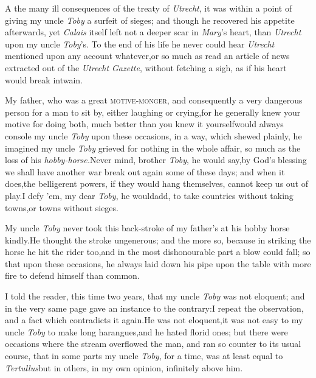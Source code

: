 \documentclass{article}
\begin{document}
\lettrine{A}{\!} the many ill consequences of
the treaty of \textit{Utrecht}, it was within a point of giving my
uncle \textit{Toby} a surfeit of sieges; and though he recovered his
appetite afterwards, yet \textit{Calais} itself left not a deeper
scar in \textit{Mary}’s heart, than \textit{Utrecht} upon my
uncle \textit{Toby}’s. To the end of his life he never could hear \textit{Utrecht} mentioned upon any
account whatever,\tsk or so much as read an article of news
extracted out of the \textit{Utrecht Gazette}, without fetching a
sigh, as if his heart would break in\break twain.

My father, who was a great \textsc{motive-monger}, and
consequently a very dangerous person for a man to sit by, either
laughing or crying,\tsk for he generally knew your motive for
doing both, much better than you knew it yourself\tsk would
always console my uncle \textit{Toby} upon these occasions, in a way,
which shewed plainly, he imagined my uncle \textit{Toby} grieved for
nothing in the whole affair, so much as the loss of his
\textit{hobby-horse.}\tsh Never mind, brother \textit{Toby},
he would say,\tsk by God’s blessing we shall have another
war break out again some of these days; and when it does,\tsk the
belligerent powers, if they would hang themselves, cannot keep us
out of play.\break\tsh I defy ’em, my dear \textit{Toby}, he
would\break add, to take countries without taking towns,\tsh or
towns without sieges.

My uncle \textit{Toby} never took this back-stroke of my
father’s at his hobby horse kindly.\tsh He thought
the stroke ungenerous; and the more so, because in striking the
horse he hit the rider too,\break and in the most dishonourable part a
blow could fall; so that upon these occasions, he always laid down
his pipe upon the table with more fire to defend himself than
common.

I told the reader, this time two years, that my uncle
\textit{Toby} was not eloquent; and in the very same page gave an
instance to the contrary:\tsh I repeat the observation,
and a fact which contradicts it again.\tsk He was not
eloquent,\tsk it was not easy to my uncle \textit{Toby} to make
long harangues,\tsk and he hated florid ones;\break
but there were occasions where the stream overflowed the man, and ran so counter to
its usual course, that in some parts my uncle \textit{Toby}, for a time, was at
least equal to \textit{Tertullus}\tsh but in others, in my own opinion, infinitely
above him.
\end{document}
